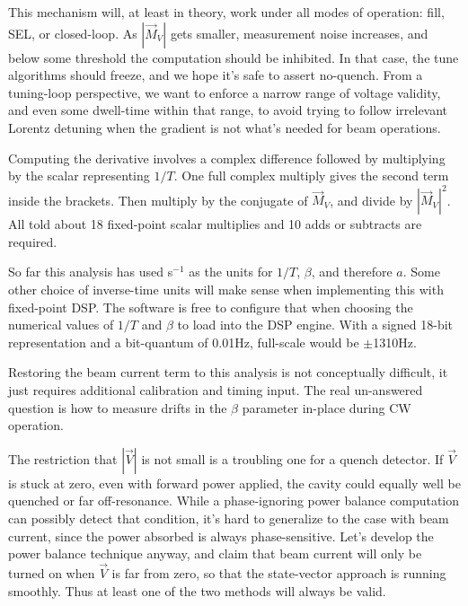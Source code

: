 This mechanism will, at least in theory, work under all modes of
operation: fill, SEL, or closed-loop.  As $|\vec M_V|$ gets smaller,
measurement noise increases, and below some threshold the computation
should be inhibited.  In that case, the tune algorithms should freeze,
and we hope it's safe to assert no-quench.
From a tuning-loop perspective, we want to enforce a narrow range of
voltage validity, and even some dwell-time within that range,
to avoid trying to follow irrelevant Lorentz detuning when the gradient
is not what's needed for beam operations.

Computing the derivative involves a complex difference %
followed by multiplying by the scalar representing $1/T$. %
One full complex multiply %
gives the second term inside the brackets.
Then multiply by the conjugate of $\vec M_V$, %
and divide by $|\vec M_V|^2$.  %
All told about 18 fixed-point scalar multiplies and 10 adds or subtracts
are required.

So far this analysis has used s$^{-1}$ as the units for $1/T$, $\beta$,
and therefore $a$.  Some other choice of inverse-time units will
make sense when implementing this with fixed-point DSP.
The software is free to configure that when choosing the numerical values of
$1/T$ and $\beta$ to load into the DSP engine.
With a signed 18-bit representation and a bit-quantum of 0.01\thinspace Hz,
full-scale would be $\pm$1310\thinspace Hz.

Restoring the beam current term to this analysis is not conceptually difficult,
it just requires additional calibration and timing input.  The real un-answered
question is how to measure drifts in the $\beta$ parameter in-place during CW operation.

The restriction that $|\vec V|$ is not small is a troubling one for
a quench detector.  If $\vec V$ is stuck at zero, even with forward power
applied, the cavity could equally well be quenched or far off-resonance.
While a phase-ignoring power balance computation can possibly detect
that condition, it's hard to generalize to the case with beam current,
since the power absorbed is always phase-sensitive.  Let's develop the
power balance technique anyway, and claim that beam current will only
be turned on when $\vec V$ is far from zero, so that the state-vector
approach is running smoothly.
Thus at least one of the two methods will always be valid.

